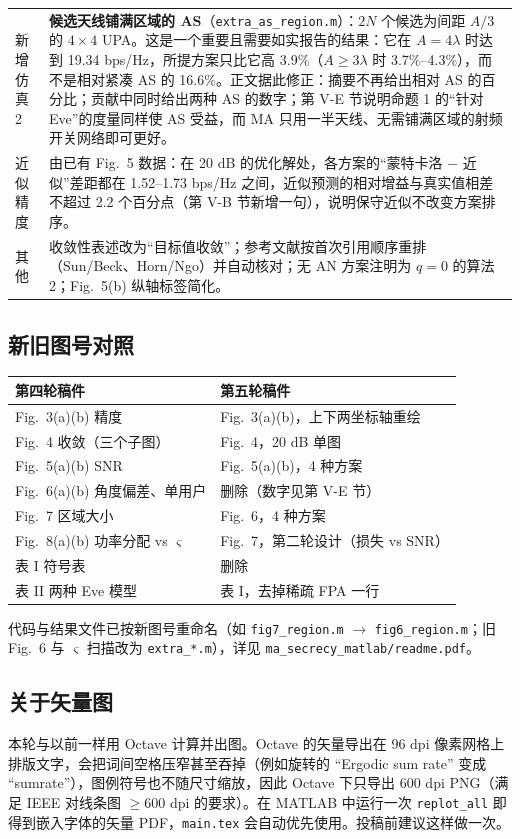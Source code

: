 \documentclass[11pt,a4paper]{ctexart}
\newcommand{\code}[1]{\texttt{#1}}
\begin{document}
\begin{longtable}{p{2.6cm}p{13.1cm}}
新增仿真 2 & \textbf{候选天线铺满区域的 AS}（\code{extra\_as\_region.m}）：$2N$ 个候选为间距 $A/3$ 的 $4\times4$ UPA。这是一个重要且需要如实报告的结果：它在 $A=4\lambda$ 时达到 19.34 bps/Hz，所提方案只比它高 3.9\%（$A\ge3\lambda$ 时 3.7\%--4.3\%），而不是相对紧凑 AS 的 16.6\%。正文据此修正：摘要不再给出相对 AS 的百分比；贡献中同时给出两种 AS 的数字；第 V-E 节说明命题 1 的“针对 Eve”的度量同样使 AS 受益，而 MA 只用一半天线、无需铺满区域的射频开关网络即可更好。\\
近似精度 & 由已有 Fig.~5 数据：在 20 dB 的优化解处，各方案的“蒙特卡洛 $-$ 近似”差距都在 1.52--1.73 bps/Hz 之间，近似预测的相对增益与真实值相差不超过 2.2 个百分点（第 V-B 节新增一句），说明保守近似不改变方案排序。\\
其他 & 收敛性表述改为“目标值收敛”；参考文献按首次引用顺序重排（Sun/Beck、Horn/Ngo）并自动核对；无 AN 方案注明为 $q=0$ 的算法 2；Fig.~5(b) 纵轴标签简化。\\
\bottomrule
\end{longtable}

\subsection{新旧图号对照}
\begin{center}\small
\begin{tabular}{ll}
\toprule
第四轮稿件 & 第五轮稿件 \\ \midrule
Fig.~3(a)(b) 精度 & Fig.~3(a)(b)，上下两坐标轴重绘 \\
Fig.~4 收敛（三个子图）& Fig.~4，20 dB 单图 \\
Fig.~5(a)(b) SNR & Fig.~5(a)(b)，4 种方案 \\
Fig.~6(a)(b) 角度偏差、单用户 & 删除（数字见第 V-E 节）\\
Fig.~7 区域大小 & Fig.~6，4 种方案 \\
Fig.~8(a)(b) 功率分配 vs $\varsigma$ & Fig.~7，第二轮设计（损失 vs SNR）\\
表 I 符号表 & 删除 \\
表 II 两种 Eve 模型 & 表 I，去掉稀疏 FPA 一行 \\
\bottomrule
\end{tabular}
\end{center}
代码与结果文件已按新图号重命名（如 \code{fig7\_region.m} $\to$ \code{fig6\_region.m}；旧 Fig.~6 与 $\varsigma$ 扫描改为 \code{extra\_*.m}），详见 \code{ma\_secrecy\_matlab/readme.pdf}。

\subsection{关于矢量图}
本轮与以前一样用 Octave 计算并出图。Octave 的矢量导出在 96 dpi 像素网格上排版文字，会把词间空格压窄甚至吞掉（例如旋转的 “Ergodic sum rate” 变成 “sumrate”），图例符号也不随尺寸缩放，因此 Octave 下只导出 600 dpi PNG（满足 IEEE 对线条图 $\ge600$ dpi 的要求）。在 MATLAB 中运行一次 \code{replot\_all} 即得到嵌入字体的矢量 PDF，\code{main.tex} 会自动优先使用。投稿前建议这样做一次。
\end{document}
